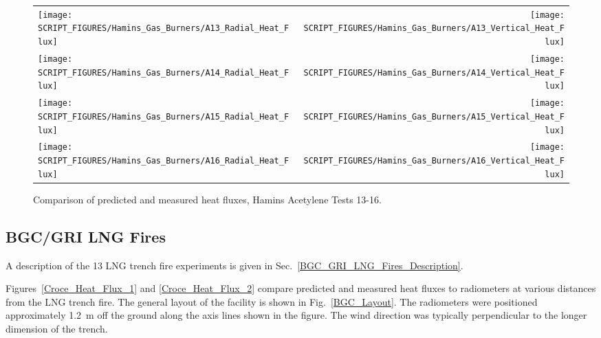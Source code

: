 \begin{figure}[p]
\begin{tabular*}{\textwidth}{l@{\extracolsep{\fill}}r}
\texttt{[image: SCRIPT\_FIGURES/Hamins\_Gas\_Burners/A13\_Radial\_Heat\_Flux]} &
\texttt{[image: SCRIPT\_FIGURES/Hamins\_Gas\_Burners/A13\_Vertical\_Heat\_Flux]} \\
\texttt{[image: SCRIPT\_FIGURES/Hamins\_Gas\_Burners/A14\_Radial\_Heat\_Flux]} &
\texttt{[image: SCRIPT\_FIGURES/Hamins\_Gas\_Burners/A14\_Vertical\_Heat\_Flux]} \\
\texttt{[image: SCRIPT\_FIGURES/Hamins\_Gas\_Burners/A15\_Radial\_Heat\_Flux]} &
\texttt{[image: SCRIPT\_FIGURES/Hamins\_Gas\_Burners/A15\_Vertical\_Heat\_Flux]} \\
\texttt{[image: SCRIPT\_FIGURES/Hamins\_Gas\_Burners/A16\_Radial\_Heat\_Flux]} &
\texttt{[image: SCRIPT\_FIGURES/Hamins\_Gas\_Burners/A16\_Vertical\_Heat\_Flux]}
\end{tabular*}
\label{Hamins_Acetylene_13-16}
\caption[Heat flux predictions, Hamins acetylene burner Tests 13-16]
{Comparison of predicted and measured heat fluxes, Hamins Acetylene Tests 13-16.}
\end{figure}

\clearpage

\subsection{BGC/GRI LNG Fires}
\label{BGC_GRI_LNG_Fires_Heat_Flux}

A description of the 13 LNG trench fire experiments is given in Sec.~\ref{BGC_GRI_LNG_Fires_Description}. 

Figures~\ref{Croce_Heat_Flux_1} and \ref{Croce_Heat_Flux_2} compare predicted and measured heat fluxes to radiometers at various distances from the LNG trench fire. The general layout of the facility is shown in Fig.~\ref{BGC_Layout}. The radiometers were positioned approximately 1.2~m off the ground along the axis lines shown in the figure. The wind direction was typically perpendicular to the longer dimension of the trench.


